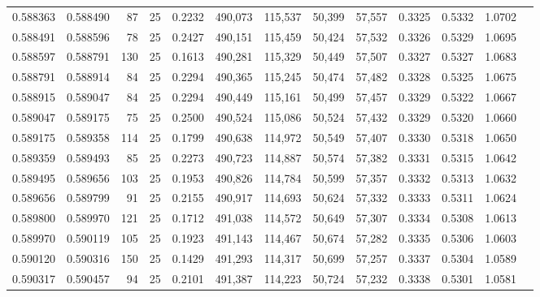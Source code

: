 \begin{tabular}{rrrrrrrrrrrrr}
0.588363 & 0.588490 &    87 &  25 &                                     0.2232 & 490,073 & 115,537 &  50,399 &  57,557 & 0.3325 & 0.5332 & 1.0702 \\
0.588491 & 0.588596 &    78 &  25 &                                     0.2427 & 490,151 & 115,459 &  50,424 &  57,532 & 0.3326 & 0.5329 & 1.0695 \\
0.588597 & 0.588791 &   130 &  25 &                                     0.1613 & 490,281 & 115,329 &  50,449 &  57,507 & 0.3327 & 0.5327 & 1.0683 \\
0.588791 & 0.588914 &    84 &  25 &                                     0.2294 & 490,365 & 115,245 &  50,474 &  57,482 & 0.3328 & 0.5325 & 1.0675 \\
0.588915 & 0.589047 &    84 &  25 &                                     0.2294 & 490,449 & 115,161 &  50,499 &  57,457 & 0.3329 & 0.5322 & 1.0667 \\
0.589047 & 0.589175 &    75 &  25 &                                     0.2500 & 490,524 & 115,086 &  50,524 &  57,432 & 0.3329 & 0.5320 & 1.0660 \\
0.589175 & 0.589358 &   114 &  25 &                                     0.1799 & 490,638 & 114,972 &  50,549 &  57,407 & 0.3330 & 0.5318 & 1.0650 \\
0.589359 & 0.589493 &    85 &  25 &                                     0.2273 & 490,723 & 114,887 &  50,574 &  57,382 & 0.3331 & 0.5315 & 1.0642 \\
0.589495 & 0.589656 &   103 &  25 &                                     0.1953 & 490,826 & 114,784 &  50,599 &  57,357 & 0.3332 & 0.5313 & 1.0632 \\
0.589656 & 0.589799 &    91 &  25 &                                     0.2155 & 490,917 & 114,693 &  50,624 &  57,332 & 0.3333 & 0.5311 & 1.0624 \\
0.589800 & 0.589970 &   121 &  25 &                                     0.1712 & 491,038 & 114,572 &  50,649 &  57,307 & 0.3334 & 0.5308 & 1.0613 \\
0.589970 & 0.590119 &   105 &  25 &                                     0.1923 & 491,143 & 114,467 &  50,674 &  57,282 & 0.3335 & 0.5306 & 1.0603 \\
0.590120 & 0.590316 &   150 &  25 &                                     0.1429 & 491,293 & 114,317 &  50,699 &  57,257 & 0.3337 & 0.5304 & 1.0589 \\
0.590317 & 0.590457 &    94 &  25 &                                     0.2101 & 491,387 & 114,223 &  50,724 &  57,232 & 0.3338 & 0.5301 & 1.0581 \\

\end{tabular}
